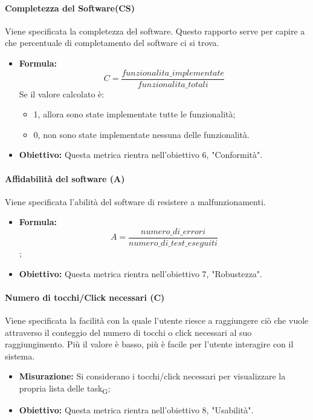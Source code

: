 	
	\paragraph{Completezza del Software(CS)}
	Viene specificata la completezza del software. Questo rapporto serve per capire a che percentuale di completamento del software ci si trova.
	\begin{itemize}
		\item \textbf{Formula:} \[C = \frac{funzionalita\_implementate }{funzionalita\_totali}\]
		Se il valore calcolato è:
		\begin{itemize}
			\item 1, allora sono state implementate tutte le funzionalità;
			\item 0, non sono state implementate nessuna delle funzionalità.
		\end{itemize}
		\item \textbf{Obiettivo:} Questa metrica rientra nell'obiettivo 6, "Conformità".
	\end{itemize}
	
	
	\paragraph{Affidabilità del software (A)}
	Viene specificata l'abilità del software di resistere a malfunzionamenti.
	\begin{itemize}
		\item \textbf{Formula:} \[A = \frac{numero\_di\_errori}{numero\_di\_test\_eseguiti}\];
		\item \textbf{Obiettivo:} Questa metrica rientra nell'obiettivo 7, "Robustezza".
	\end{itemize}
	
	
	\paragraph{Numero di tocchi/Click necessari (C)}
	Viene specificata la facilità con la quale l'utente riesce a raggiungere ciò che vuole attraverso il conteggio del numero di tocchi o click necessari al suo raggiungimento. Più il valore è basso, più è facile per l'utente interagire con il sistema.
	\begin{itemize}
		\item \textbf{Misurazione:} Si considerano i tocchi/click necessari per visualizzare la propria lista delle task\textsubscript{G};
		\item \textbf{Obiettivo:} Questa metrica rientra nell'obiettivo 8, "Usabilità".
	\end{itemize}
	
